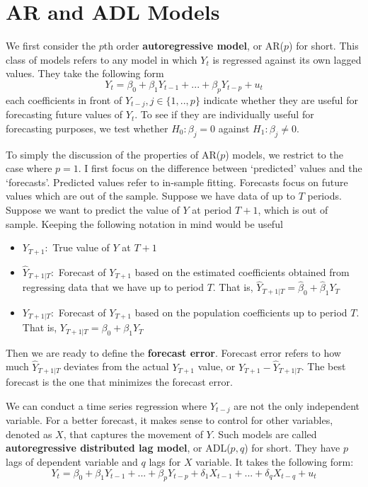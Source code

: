 \section{AR and ADL Models}
We first consider the $p$th order \textbf{autoregressive model}, or AR($p$) for short. This class of models refers to any model in which $Y_t$ is regressed against its own lagged values. They take the following form
\[
Y_t = \beta_0+\beta_1Y_{t-1}+...+\beta_pY_{t-p}+u_t \tag{2}
\]
each coefficients in front of $Y_{t-j}, j\in\{1,..,p\}$ indicate whether they are useful for forecasting future values of $Y_t$. To see if they are individually useful for forecasting purposes, we test whether $H_0:\beta_j=0$ against $H_1:\beta_j\neq0$.
\par\medskip
To simply the discussion of the properties of AR($p$) models, we restrict to the case where $p=1$. I first focus on the difference between `predicted' values and the `forecasts'. Predicted values refer to in-sample fitting. Forecasts focus on future values which are out of the sample. Suppose we have data of up to $T$ periods. Suppose we want to predict the value of $Y$ at period $T+1$, which is out of sample. Keeping the following notation in mind would be useful
\begin{itemize}
\item $Y_{T+1}: $ True value of $Y$ at $T+1$
\item $\hat{Y}_{T+1|T}: $ Forecast of $Y_{T+1}$ based on the estimated coefficients obtained from regressing data that we have up to period $T$. That is, $\hat{Y}_{T+1|T}=\hat{\beta}_0+\hat{\beta}_1Y_T$
\item $Y_{T+1|T}: $ Forecast of $Y_{T+1}$ based on the population coefficients up to period $T$. That is, $Y_{T+1|T}=\beta_0+\beta_1Y_T$
\end{itemize}
Then we are ready to define the \textbf{forecast error}. Forecast error refers to how much $\hat{Y}_{T+1|T}$ deviates from the actual $Y_{T+1}$ value, or $Y_{T+1}-\hat{Y}_{T+1|T}$. The best forecast is the one that minimizes the forecast error. 
\par\medskip
We can conduct a time series regression where $Y_{t-j}$ are not the only independent variable. For a better forecast, it makes sense to control for other variables, denoted as $X$, that captures the movement of $Y$. Such models are called \textbf{autoregressive distributed lag model}, or ADL($p,q$) for short. They have $p$ lags of dependent variable and $q$ lags for $X$ variable. It takes the following form:
\[
Y_t = \beta_0+\beta_1Y_{t-1}+...+\beta_p Y_{t-p} + \delta_1 X_{t-1}+...+\delta_qX_{t-q}+u_t \tag{3}
\]
